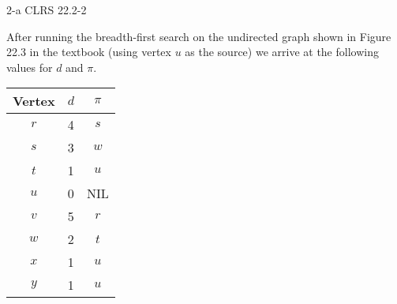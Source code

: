 \documentclass[11pt]{article}
\begin{document}
\begin{prob}{2-a}
CLRS 22.2-2
\end{prob}
\begin{sol} 

After running the breadth-first search on the undirected graph shown in Figure 22.3 in the textbook (using vertex $u$ as the source) we arrive at the following values for $d$ and $\pi$.

\begin{center}
  \begin{tabular}{| c | c  c |}
    \hline
	Vertex & $d$ & $\pi$ \\ \hline
	$r$ & 4 & $s$ \\
	$s$ & 3 & $w$ \\
	$t$ & 1 & $u$ \\
	$u$ & 0 & NIL\\ 
	$v$ & 5 & $r$\\ 
	$w$ & 2 & $t$\\
	$x$ & 1 & $u$\\
	$y$ & 1 & $u$\\ \hline
  \end{tabular}
\end{center}

\end{sol}
\end{document}
